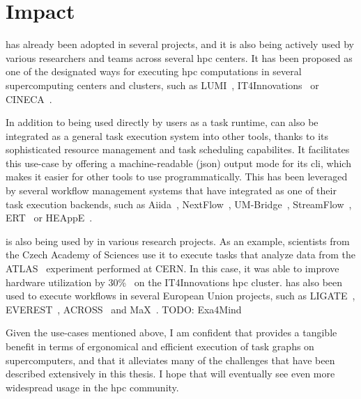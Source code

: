 \section*{Impact}
\hyperqueue{} has already been adopted in several projects, and it is also being actively
used by various researchers and teams across several \gls{hpc} centers. It has been
proposed as one of the designated ways for executing \gls{hpc} computations in
several supercomputing centers and clusters, such as LUMI~\cite{it4i-lumi},
IT4Innovations~\cite{it4i-hq} or CINECA~\cite{cineca}.

In addition to being used directly by users as a task runtime, \hyperqueue{} can also be
integrated as a general task execution system into other tools, thanks to its sophisticated
resource management and task scheduling capabilites. It facilitates this use-case by offering a
machine-readable (\gls{json}) output mode for its \gls{cli}, which makes
it easier for other tools to use \hyperqueue{} programmatically. This has been leveraged
by several workflow management systems that have integrated \hyperqueue{} as one of their
task execution backends, such as Aiida~\cite{aiida-hq}, NextFlow~\cite{nextflow-hq},
UM-Bridge~\cite{umbridge}, StreamFlow~\cite{streamflow-hq}, ERT~\cite{ert}
or HEAppE~\cite{heappe}.

\hyperqueue{} is also being used by in various research projects. As an example,
scientists from the Czech Academy of Sciences use it to execute tasks that analyze data from the
ATLAS~\cite{atlas} experiment performed at CERN. In this case, it was able to improve
hardware utilization by 30\%~\cite{cern-hq} on the IT4Innovations \gls{hpc}
cluster. \hyperqueue{} has also been used to execute workflows in several European Union
projects, such as LIGATE~\cite{ligate}, EVEREST~\cite{everest},
ACROSS~\cite{across} and MaX~\cite{max}. TODO: Exa4Mind

Given the use-cases mentioned above, I am confident that \hyperqueue{} provides a
tangible benefit in terms of ergonomical and efficient execution of task graphs on supercomputers,
and that it alleviates many of the challenges that have been described extensively in this thesis.
I hope that \hyperqueue{} will eventually see even more widespread usage in the
\gls{hpc} community.
